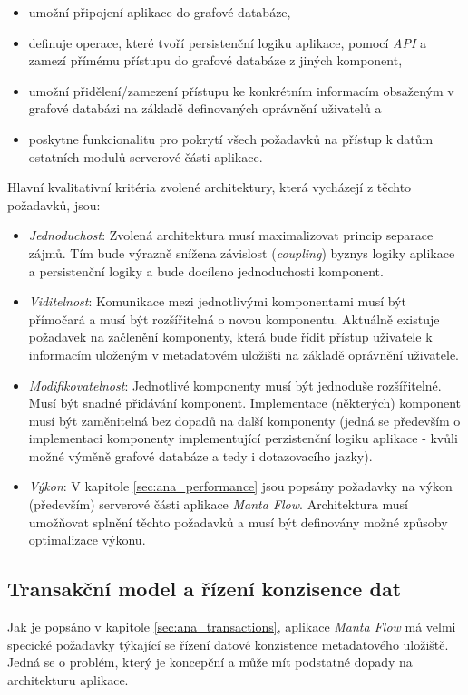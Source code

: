 \begin{itemize}
   \item umožní připojení aplikace do grafové databáze,
   \item definuje operace, které tvoří persistenční logiku aplikace, pomocí \textit{API} a zamezí přímému přístupu do grafové databáze z jiných komponent,
   \item umožní přidělení/zamezení přístupu ke konkrétním informacím obsaženým v grafové databázi na základě definovaných oprávnění uživatelů a
   \item poskytne funkcionalitu pro pokrytí všech požadavků na přístup k datům ostatních modulů serverové části aplikace.
\end{itemize}

Hlavní kvalitativní kritéria zvolené architektury, která vycházejí z těchto požadavků, jsou:

\begin{itemize}
   \item{\textit{Jednoduchost}}: Zvolená architektura musí maximalizovat princip separace zájmů. Tím bude výrazně snížena závislost (\textit{coupling}) byznys logiky aplikace a persistenční logiky a bude docíleno jednoduchosti komponent.
   \item{\textit{Viditelnost}}: Komunikace mezi jednotlivými komponentami musí být přímočará a musí být rozšířitelná o novou komponentu. Aktuálně existuje požadavek na začlenění komponenty, která bude řídit přístup uživatele k informacím uloženým v metadatovém uložišti na základě oprávnění uživatele.
   \item{\textit{Modifikovatelnost}}: Jednotlivé komponenty musí být jednoduše rozšířitelné. Musí být snadné přidávání komponent. Implementace (některých) komponent musí být zaměnitelná bez dopadů na další komponenty (jedná se především o implementaci komponenty implementující perzistenční logiku aplikace - kvůli možné výměně grafové databáze a tedy i dotazovacího jazky).
   \item{\textit{Výkon}}: V kapitole \ref{sec:ana_performance} jsou popsány požadavky na výkon (především) serverové části aplikace \textit{Manta Flow}. Architektura musí umožňovat splnění těchto požadavků a musí být definovány možné způsoby optimalizace výkonu.
\end{itemize}

\subsection{Transakční model a řízení konzisence dat}
\label{sec:des_transactions}
Jak je popsáno v kapitole \ref{sec:ana_transactions}, aplikace \textit{Manta Flow} má velmi specické požadavky týkající se řízení datové konzistence metadatového uložiště. Jedná se o problém, který je koncepční a může mít podstatné dopady na architekturu aplikace.

